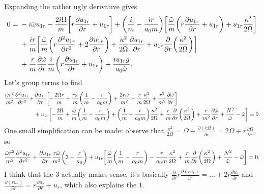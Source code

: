 \documentclass[11pt,
        usenames, %
        dvipsnames %
    ]{report}
\newcommand*{\pd}[2]{\frac{\partial#1}{\partial#2}}
\newcommand*{\ptd}[2]{\frac{\partial^2 #1}{\partial#2^2}}
\DeclarePairedDelimiter\p{\lparen}{\rparen}
\DeclarePairedDelimiter\s{\lbrack}{\rbrack}
\begin{document}
Expanding the rather ugly derivative gives
\begin{align}
    0 ={}& -i\tilde{\omega}u_{1r} - \frac{2i\Omega}{m}\s*{r\pd{u_{1r}}{r}
        + u_{1r}} + \p*{\frac{i}{m} - \frac{ir}{a_0m}}
            \s*{\frac{\tilde{\omega}}{m}
            \p*{r\pd{u_{1r}}{r} + u_{1r}} + u_{1r}\frac{\kappa^2}{2\Omega}}
            \nonumber\\
        &+ \frac{ir}{m}\s*{\frac{\tilde{\omega}}{m}\p*{r\ptd{u_{1r}}{r}
            + 2\pd{u_{1r}}{r}} + \frac{\kappa^2}{2\Omega}\pd{u_{1r}}{r}
            + u_{1r}\pd{}{r}\p*{\frac{\kappa^2}{2\Omega}}}
            \nonumber\\
        &+ \frac{r}{m}\pd{\tilde{\omega}}{r}\frac{i}{m}\p*{r\pd{u_{1r}}{r}
            + u_{1r}} + \frac{iu_{1r}g}{a_0\tilde{\omega}}.
\end{align}
Let's group terms to find
\begin{align}
    \frac{\tilde{\omega}r^2}{m^2}\ptd{u_{1r}}{r} + &
        \pd{u_{1r}}{r}\s*{-\frac{2\Omega r}{m}
            + \frac{r\tilde{\omega}}{m} \p*{\frac{1}{m} - \frac{r}{a_0m}}
            + \frac{2r\tilde{\omega}}{m^2}
            + \frac{r}{m}\frac{\kappa^2}{2\Omega}
            + \frac{r^2}{m^2}\pd{\tilde{\omega}}{r}}\nonumber\\
        & +u_{1r}\s*{-\frac{2\Omega}{m}
            + \frac{\tilde{\omega}}{m} \p*{\frac{1}{m} - \frac{r}{a_0m}}
            + \p*{\frac{1}{m} - \frac{r}{a_0m}}\frac{\kappa^2}{2\Omega}
            + \frac{r}{m}\pd{}{r}\p*{\frac{\kappa^2}{2\Omega}}
            + \frac{r}{m^2}\pd{\tilde{\omega}}{r}
            + \frac{N^2}{\tilde{\omega}} - \tilde{\omega}} = 0.
\end{align}
One small simplification can be made: observe that $\frac{\kappa^2}{2\Omega} =
\Omega + \pd{(r\Omega)}{r} = 2\Omega + r\pd{\Omega}{r}$, so
\begin{equation}
    \frac{\tilde{\omega}r^2}{m^2}\ptd{u_{1r}}{r}
        + \pd{u_{1r}}{r}
            \frac{r\tilde{\omega}}{m^2} \p*{3 - \frac{r}{a_0}}
        + u_{1r}\s*{
            \frac{\tilde{\omega}}{m} \p*{\frac{1}{m} - \frac{r}{a_0m}}
            - \frac{r}{a_0m}\frac{\kappa^2}{2\Omega}
            + \frac{r}{m}\pd{}{r}\p*{\frac{\kappa^2}{2\Omega}}
            + \frac{N^2}{\tilde{\omega}} - \tilde{\omega}} = 0.
\end{equation}
I think that the $3$ actually makes sense, it's basically
$\pd{}{r}r\pd{(ru_r)}{r} = \dots + 2r\pd{u_r}{r}$ and $\pd{(ru_r)}{r} =
r\pd{u_r}{r} + u_r$, which also explains the $1$.
\end{document}
